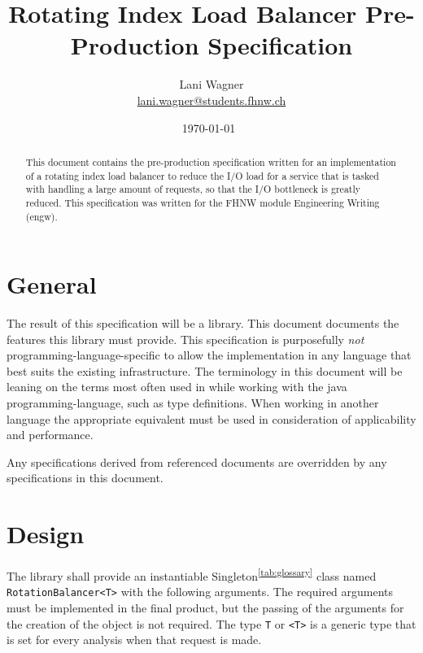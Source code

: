 \documentclass[11pt]{article} %
\title{Rotating Index Load Balancer Pre-Production Specification}
\author{Lani Wagner\\\href{mailto:lani.wagner@students.fhnw.ch}{lani.wagner@students.fhnw.ch}}
\date{\today\ \currenttime} %
\begin{document}
    \VerbatimFootnotes
    \clearpage\maketitle
    \thispagestyle{empty}
    \begin{abstract}
        This document contains the pre-production specification written for an implementation of a rotating index
        load balancer to reduce the I/O load for a service that is tasked with handling a large amount of requests,
        so that the I/O bottleneck is greatly reduced. This specification was written for the FHNW module Engineering
        Writing (engw).
    \end{abstract}
    {\hypersetup{hidelinks} \tableofcontents}
    \newpage



    \section{General}

    The result of this specification will be a library. This document documents the features this library must provide. This specification is purposefully \textit{not} programming-language-specific to allow the implementation in any language that best suits the existing infrastructure. The terminology in this document will be leaning on the terms most often used in while working with the java programming-language, such as type definitions. When working in another language the appropriate equivalent must be used in consideration of applicability and performance.

    Any specifications derived from referenced documents are overridden by any specifications in this document.



    \section{Design}

    The library shall provide an instantiable Singleton\textsuperscript{\ref{tab:glossary}} class named
    \verb|RotationBalancer<T>| with the following arguments. The required arguments must be implemented in the final
    product, but the passing of the arguments for the creation of the object is not required. The type \verb|T| or
    \verb|<T>| is a generic type that is set for every analysis when that request is made.
\end{document}
